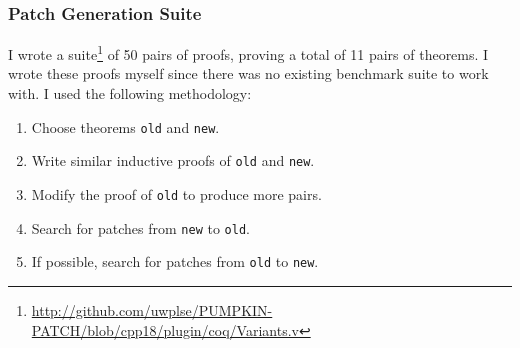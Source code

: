 \subsubsection{Patch Generation Suite}
\label{sec:suite}

I wrote a suite\footnote{\url{http://github.com/uwplse/PUMPKIN-PATCH/blob/cpp18/plugin/coq/Variants.v}} of 50 pairs of proofs,
proving a total of 11 pairs of theorems.
I wrote these proofs myself since there was no existing benchmark suite to work with.
I used the following methodology:

\begin{enumerate}
\item Choose theorems \lstinline{old} and \lstinline{new}.
\item Write similar inductive proofs of \lstinline{old} and \lstinline{new}.
\item Modify the proof of \lstinline{old} to produce more pairs.
\item Search for patches from \lstinline{new} to \lstinline{old}.
\item If possible, search for patches from \lstinline{old} to \lstinline{new}.
\end{enumerate}

\iffalse
For example, one pair of theorems \lstinline{old} and \lstinline{new} was a 
simplification of the auxiliary lemmas
that we encountered in the case study in Section~\ref{sec:foundations}.
For the first proof of \lstinline{old}, we added a rewrite, like in the case study:

\begin{lstlisting}[language=coq]
    (@\diff{rewrite <- plus\_n\_O.}@) rewrite -> plus_comm.
\end{lstlisting}

For the second proof of \lstinline{old}, we commuted the rewrites:

\begin{lstlisting}[language=coq]
    rewrite -> plus_comm. (@\diff{rewrite <- plus\_n\_O.}@)
\end{lstlisting} 

We then searched for patches in both directions,
since the conclusions of \lstinline{old}
and \lstinline{new} were propositionally equal.
\fi

